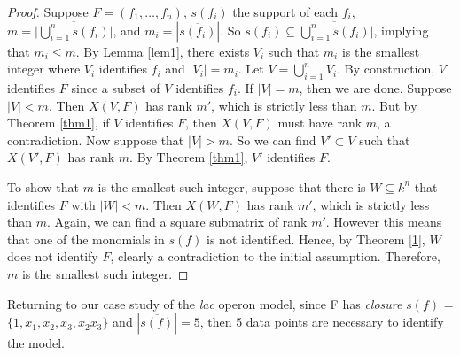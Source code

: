 \documentclass{amsart}
\newtheorem{cor}[thm]{Corollary}
\newtheorem{prop}[thm]{Proposition}
\theoremstyle{definition}
\theoremstyle{remark}
\theoremstyle{example}
\theoremstyle{conjecture}
\numberwithin{equation}{section}
\begin{document}
\begin{proof}
Suppose $F=(f_1,\ldots,f_n)$, $s(f_i)$ the support of each $f_i$,
$m=\lvert \overline{\bigcup_{i=1}^n s(f_i)}\rvert$, and
$m_i=|\overline{s(f_i)}|$. So $s(f_i)\subseteq
\overline{\bigcup_{i=1}^n s(f_i)}\rvert$, implying that $m_i\leq m$.
By Lemma \ref{lem1}, there exists $V_i$ such that $m_i$ is the
smallest integer where $V_i$ identifies $f_i$ and $|V_i|=m_i$.  Let
$V=\bigcup_{i=1}^n V_i$.  By construction, $V$ identifies $F$ since
a subset of $V$ identifies $f_i$.
If $|V|=m$, then we are done.  Suppose $|V|<m$.  Then $X(V,F)$ has
rank $m'$, which is strictly less than $m$. But by Theorem
\ref{thm1}, if $V$ identifies $F$, then $X(V,F)$ must have rank $m$,
a contradiction.  Now suppose that $|V|>m$. So we can find
$V'\subset V$ such that $X(V',F)$ has rank $m$.  By Theorem
\ref{thm1}, $V'$ identifies $F$.

To show that $m$ is the smallest such integer, suppose that there is
$W\subseteq k^n$ that identifies $F$ with $|W|<m$.  Then $X(W,F)$
has rank $m'$, which is strictly less than $m$.  Again, we can find
a square submatrix of rank $m'$.  However this means that one of the
monomials in $s(f)$ is not identified.  Hence, by Theorem
\ref{1}, $W$ does not identify $F$, clearly a contradiction to
the initial assumption.  Therefore, $m$ is the smallest such
integer.
\end{proof}

Returning to our case study of the \textit{lac} operon model, since F has \emph{closure} $\overline{s(f)}$ = $\{1, x_1, x_2, x_3, x_2x_3\}$ and $|\overline{s(f)}| = 5$, then 5 data points are necessary to identify the model.


\end{document}
